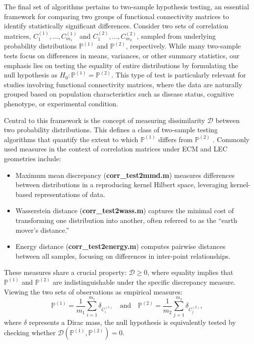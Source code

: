 \documentclass[10pt]{article}
\begin{document}
The final set of algorithms pertains to two-sample hypothesis testing, an essential framework for comparing two groups of functional connectivity matrices to identify statistically significant differences. Consider two sets of correlation matrices, $C_1^{(1)}, \ldots, C_{m_1}^{(1)}$ and $C_1^{(2)}, \ldots, C_{m_2}^{(2)}$, sampled from underlying probability distributions $\mathbb{P}^{(1)}$ and $\mathbb{P}^{(2)}$, respectively. While many two-sample tests focus on differences in means, variances, or other summary statistics, our emphasis lies on testing the equality of entire distributions by formulating the null hypothesis as $H_0: \mathbb{P}^{(1)} = \mathbb{P}^{(2)}$. This type of test is particularly relevant for studies involving functional connectivity matrices, where the data are naturally grouped based on population characteristics such as disease status, cognitive phenotype, or experimental condition.

Central to this framework is the concept of measuring dissimilarity $\mathcal{D}$ between two probability distributions. This defines a class of two-sample testing algorithms that quantify the extent to which $\mathbb{P}^{(1)}$ differs from $\mathbb{P}^{(2)}$ \citep{ramdas_2017_WassersteinTwoSampleTesting}. Commonly used measures in the context of correlation matrices under ECM and LEC geometries include:

\begin{itemize}
	\item Maximum mean discrepancy (\textbf{corr\_test2mmd.m}) measures differences between distributions in a reproducing kernel Hilbert space, leveraging kernel-based representations of data.
	\item Wasserstein distance (\textbf{corr\_test2wass.m}) captures the minimal cost of transforming one distribution into another, often referred to as the ``earth mover’s distance.''
	\item Energy distance (\textbf{corr\_test2energy.m}) computes pairwise distances between all samples, focusing on differences in inter-point relationships.
\end{itemize}

These measures share a crucial property: $\mathcal{D} \geq 0$, where equality implies that $\mathbb{P}^{(1)}$ and $\mathbb{P}^{(2)}$ are indistinguishable under the specific discrepancy measure. Viewing the two sets of observations as empirical measures:
\begin{equation*} 
	\mathbb{P}^{(1)} = \frac{1}{m_1} \sum_{i=1}^{m_1} \delta_{C_i^{(1)}} \quad \text{and} \quad \mathbb{P}^{(2)} = \frac{1}{m_2} \sum_{j=1}^{m_2} \delta_{C_j^{(2)}}, 
\end{equation*} 
where $\delta$ represents a Dirac mass, the null hypothesis is equivalently tested by checking whether $\mathcal{D}(\mathbb{P}^{(1)}, \mathbb{P}^{(2)}) = 0$.
\end{document}
